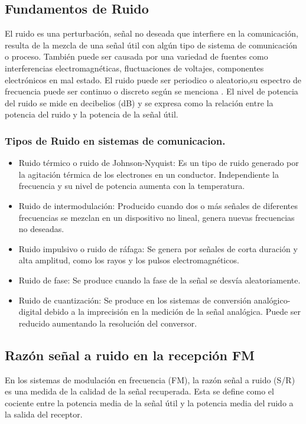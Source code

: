 \documentclass[conference]{IEEEtran}
\begin{document}
	\subsection{Fundamentos de Ruido}
	El ruido es una perturbación, señal  no deseada que interfiere en la comunicación, resulta de la mezcla de una señal útil con algún tipo de sistema de comunicación o proceso. También puede ser causada por una variedad de fuentes como interferencias electromagnéticas, fluctuaciones de voltajes, componentes electrónicos en mal estado.
	El ruido puede ser periodico o aleatorio,su espectro de frecuencia puede ser continuo o discreto según se menciona \cite{stremler2006}. El nivel de potencia del ruido se mide en decibelios (dB) y se expresa como la relación entre la potencia del ruido y la potencia de la señal útil.
	
	\subsubsection*{Tipos de Ruido en sistemas de comunicacion.}
	\begin{itemize}
		\item Ruido térmico o ruido de Johnson-Nyquist: Es un tipo de ruido generado por la agitación térmica de los electrones en un conductor. Independiente la frecuencia y su nivel de potencia aumenta con la temperatura.
		\item Ruido de intermodulación: Producido cuando dos o más señales de diferentes frecuencias se mezclan en un dispositivo no lineal, genera nuevas frecuencias no deseadas.
		\item Ruido impulsivo o ruido de ráfaga: Se genera por señales de corta duración y alta amplitud, como los rayos y los pulsos electromagnéticos.
		\item Ruido de fase: Se produce cuando la fase de la señal se desvía aleatoriamente.
		\item Ruido de cuantización: Se produce en los sistemas de conversión analógico-digital debido a la imprecisión en la medición de la señal analógica. Puede ser reducido aumentando la resolución del conversor.     
	\end{itemize}
	\subsection{Razón señal a ruido en la recepción FM}
	En los sistemas de modulación en frecuencia (FM), la razón señal a ruido (S/R) es una medida de la calidad de la señal recuperada. Esta se define como el cociente entre la potencia media de la señal útil y la potencia media del ruido a la salida del receptor.
\end{document}
